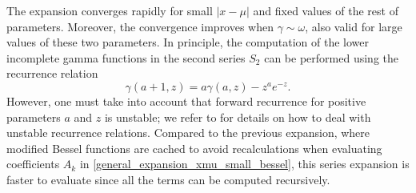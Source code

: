 \documentclass[10pt,a4paper,oneside]{article}
\numberwithin{equation}{section}
\begin{document}
The expansion converges rapidly for small $|x-\mu|$ and fixed values of the rest of parameters. Moreover, the convergence improves when $\gamma \sim \omega$, also valid for large values of these two parameters. In principle, the computation of the lower incomplete gamma functions in the second series $S_2$ can be performed using the recurrence relation
\begin{equation}
\gamma(a +1, z) = a \gamma(a, z) - z^a e^{-z}.
\end{equation}
However, one must take into account that forward recurrence for positive parameters $a$ and $z$ is unstable; we refer to \cite[\S 13]{Temme1996} for details on how to deal with unstable recurrence relations. Compared to the previous expansion, where modified Bessel functions are cached to avoid recalculations when evaluating coefficients $A_k$ in \eqref{general_expansion_xmu_small_bessel}, this series expansion is faster to evaluate since all the terms can be computed recursively.
\end{document}
